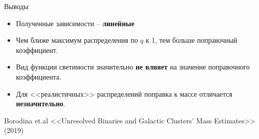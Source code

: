 \documentclass[pdf]{beamer}
\begin{document}
	\begin{frame}{Выводы}
		\begin{itemize}
			\item Полученные зависимости -- {\bf линейные}
			\item Чем ближе максимум распределения по $q$ к 1, тем больше поправочный коэффициент.
			\item Вид функции светимости значительно {\bf не влияет} на значение поправочного коэффициента.
			\item Для <<реалистичных>> распределений поправка к массе отличается {\bf незначительно}.
		\end{itemize}
		
	\vspace{2cm}

	{\footnotesize Borodina et.al  <<Unresolved Binaries and Galactic Clusters’ Mass Estimates>> (2019)}
	\end{frame}



	
\end{document}
